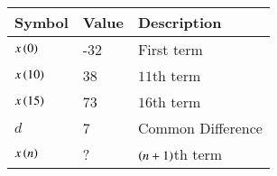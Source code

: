 \begin{tabular}{|m{5em} |m{5em}| m{10em} | }
    \hline
    \textbf{Symbol} &\textbf{Value} &\textbf{Description} \\
    \hline
         $x\left(0\right)$ & -32 & First term  \\
    \hline
        $x\left(10\right)$ & 38  & $11$th term \\
    \hline
        $x\left(15\right)$ & 73 & $16$th term\\
    \hline
        $d$ & 7 & Common Difference\\
    \hline
        $x\left(n\right)$ & ? & $\left(n+1\right)$th term\\
    \hline
    \end{tabular} 